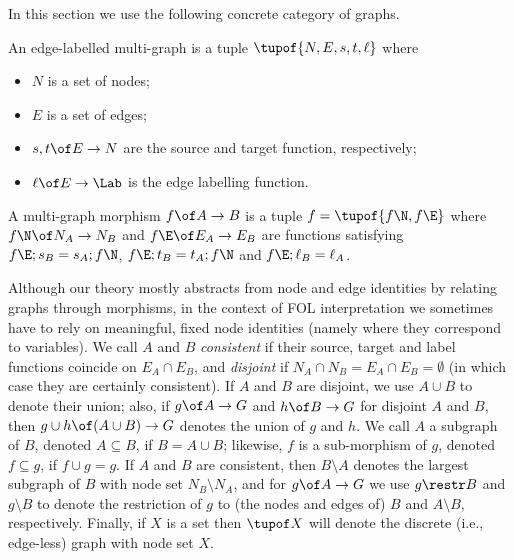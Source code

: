 In this section we use the following concrete category of graphs.
%
\begin{definition}
An edge-labelled multi-graph is a tuple $\tupof{N,E,s,t,\ell}$ where
\begin{itemize}
\item $N$ is a set of nodes;
\item $E$ is a set of edges;
\item $s,t\of E\to N$ are the source and target function, respectively;
\item $\ell\of E\to \Lab$ is the edge labelling function.
\end{itemize}
A multi-graph morphism $f\of A\to B$ is a tuple $f=\tupof{f\N,f\E}$ where $f\N\of N_A\to N_B$ and $f\E\of E_A\to E_B$ are functions satisfying $f\E;s_B=s_A;f\N$, $f\E;t_B=t_A;f\N$ and $f\E;\ell_B=\ell_A$.
\end{definition}
%
Although our theory mostly abstracts from node and edge identities by relating graphs through morphisms, in the context of FOL interpretation we sometimes have to rely on meaningful, fixed node identities (namely where they correspond to variables). We call $A$ and $B$ \emph{consistent} if their source, target and label functions coincide on $E_A\cap E_B$, and \emph{disjoint} if $N_A\cap N_B=E_A\cap E_B=\emptyset$ (in which case they are certainly consistent).  If $A$ and $B$ are disjoint, we use $A\cup B$ to denote their union; also, if $g\of A\to G$ and $h\of B\to G$ for disjoint $A$ and $B$, then $g\cup h\of (A\cup B)\to G$ denotes the union of $g$ and $h$. We call $A$ a subgraph of $B$, denoted $A\subseteq B$, if $B=A\cup B$; likewise, $f$ is a sub-morphism of $g$, denoted $f\subseteq g$, if $f\cup g=g$. If $A$ and $B$ are consistent, then $B\setminus A$ denotes the largest subgraph of $B$ with node set $N_B\setminus N_A$, and for $g\of A\to G$ we use $g\restr B$ and $g\setminus B$ to denote the restriction of $g$ to (the nodes and edges of) $B$ and $A\setminus B$, respectively. Finally, if $X$ is a set then $\tupof X$ will denote the discrete (i.e., edge-less) graph with node set $X$.

